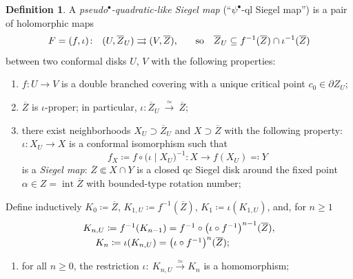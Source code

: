\documentclass{amsart}
\renewcommand{\sp}{{\ \ }}
\newcommand{\1}{{\mathbb 1 }}
\newcommand\intr{\operatorname{int}}
\theoremstyle{remark}
\numberwithin{equation}{section}
\theoremstyle{definition}
\newtheorem{defn}[thm]{Definition}
\begin{document}
\begin{defn}
\label{dfn:psi:Siegel:ql}
A {\em  pseudo${}^\bullet$-quadratic-like Siegel map} (``$\psi^\bullet$-ql Siegel map'') 
is a pair of holomorphic  maps
\begin{equation}
\label{eq:dfn:psib-ql}
F=(f,\iota)\colon \sp ( U, \overline Z_U)  \rightrightarrows (V, \overline Z ),\hspace{0.5cm}\text{ so }\sp  \overline Z_U \subseteq f^{-1}(\overline Z) \cap  \iota^{-1}(\overline Z) 
\end{equation} between two conformal  disks $U$, $V$
with the following properties:


\begin{enumerate}[label=\text{(\Roman*)},font=\normalfont,leftmargin=*]
\item\label{dfn:psib-ql:1}  $f\colon U\to V$ is a double branched covering with a unique critical point $c_0\in \partial Z_U$;

\item \label{dfn:psib-ql:2} $\overline Z$ is $\iota$-proper; in particular, $\iota \colon \overline Z_U\ \overset{\simeq}\longrightarrow \ \overline Z;$

\item \label{dfn:psib-ql:5}
 there exist neighborhoods $X_U\supset \overline Z _U$ and $X \supset \overline Z$ with the following property: $\iota: X_U \to X$ is a conformal isomorphism such that
\begin{equation}\label{eq:dfn:ql b domain}
f_X\coloneqq f\circ \big(\iota\mid X_U\big)^{-1} : X \to f(X_U)\eqqcolon Y 
\end{equation} 
 is a \emph{Siegel map}: $\overline Z \Subset X\cap Y$ is a closed qc Siegel disk around the fixed point $\alpha \in Z=\intr \overline Z$ with bounded-type rotation number;

\end{enumerate}
Define inductively $K_0\coloneqq \overline Z$, $K_{1, U}\coloneqq f^{-1}(\overline Z)$, $K_{1}\coloneqq\iota(K_{1, U})$,  and, for $n\ge 1$   
\begin{equation}
\label{eq:C:dfn:K_n}
\begin{matrix} K_{n,U}\coloneqq f^{-1}(K_{n-1})=f^{-1}\circ \big(\iota \circ f^{-1}\big)^{n-1} (\overline Z), \vspace{0.1cm}\\ K_n \coloneqq \iota(K_{n,U})=\big(\iota \circ f^{-1}\big)^n (\overline Z);\hspace{1.2cm} \end{matrix}
\end{equation}
\begin{enumerate}[label=\text{(\Roman*)},font=\normalfont,leftmargin=*,start=4]
\item  \label{dfn:psib-ql:4} for all $n\ge 0$, the restriction
$\iota \colon \ K_{n,U} \overset{\simeq}{\longrightarrow} K_n $ is a homomorphism;


\end{enumerate}
\end{defn}
\end{document}
